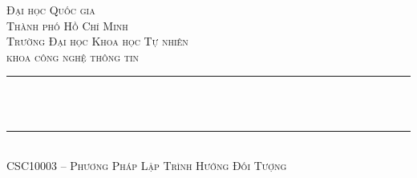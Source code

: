 \thispagestyle{empty}
\begin{titlepage}
	\begin{center}
		\makeatletter
		\newcommand{\HRule}{\rule{\linewidth}{0.4mm}}

		\textsc{\LARGE Đại học Quốc gia\\Thành phố Hồ Chí Minh}\\[1.5cm]
		\textsc{\Large Trường Đại học Khoa học Tự nhiên}\\[0.5cm]
		\textsc{\Large khoa công nghệ thông tin}\\[1.5cm]

		{\HRule}\\[1cm]
		{\huge \bfseries \@title}\\[0.5cm]
		{\HRule}\\[2cm]

		\textsc{\large CSC10003 -- Phương Pháp Lập Trình Hướng Đối Tượng}\\[0.5cm]

		\vfill\vfill\vfill

		{\large \@author}\\[1.5cm]
		{\large \@date}
		\makeatother
	\end{center}
\end{titlepage}